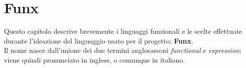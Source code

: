 \chapter{Funx}
\label{chap:2-funx}

Questo capitolo descrive brevemente i linguaggi funzionali e le scelte effettuate
durante l'ideazione del linguaggio usato per il progetto: \textbf{Funx}. \\
Il nome nasce dall'unione dei due termini anglosassoni \textit{functional} e \textit{expression};
viene quindi pronunciato \textipa{["f2nIk"s]} in inglese, o comunque  in italiano.





\newpage



